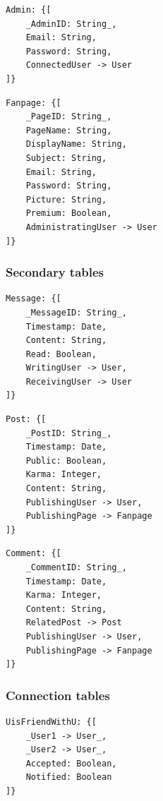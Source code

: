 \documentclass[11pt,a4paper]{report}
\begin{document}
\begin{lstlisting}[frame=single, caption=\emph{Admin}-table, keepspaces=true, breaklines=true]
Admin: {[
    _AdminID: String_, 
    Email: String, 
    Password: String,
    ConnectedUser -> User
]}
\end{lstlisting}

\begin{lstlisting}[frame=single, caption=\emph{Fanpage}-table, keepspaces=true, breaklines=true]
Fanpage: {[
    _PageID: String_, 
    PageName: String,
    DisplayName: String,
    Subject: String,
    Email: String, 
    Password: String,
    Picture: String,
    Premium: Boolean,
    AdministratingUser -> User
]}
\end{lstlisting}

\subsubsection{Secondary tables}
\begin{lstlisting}[frame=single, caption=\emph{Messages}-table, keepspaces=true, breaklines=true]
Message: {[
    _MessageID: String_, 
    Timestamp: Date,
    Content: String,
    Read: Boolean,
    WritingUser -> User,
    ReceivingUser -> User
]}
\end{lstlisting}

\begin{lstlisting}[frame=single, caption=\emph{Post}-table, keepspaces=true, breaklines=true]
Post: {[
    _PostID: String_, 
    Timestamp: Date,
    Public: Boolean,
    Karma: Integer,
    Content: String,
    PublishingUser -> User,
    PublishingPage -> Fanpage
]}
\end{lstlisting}

\begin{lstlisting}[frame=single, caption=\emph{Comments}-table, keepspaces=true, breaklines=true]
Comment: {[
    _CommentID: String_, 
    Timestamp: Date,
    Karma: Integer,
    Content: String,
    RelatedPost -> Post
    PublishingUser -> User,
    PublishingPage -> Fanpage
]}
\end{lstlisting}

\subsubsection{Connection tables}
\begin{lstlisting}[frame=single, caption=\emph{User is friend with user}-table, keepspaces=true, breaklines=true]
UisFriendWithU: {[
    _User1 -> User_, 
    _User2 -> User_,
    Accepted: Boolean,
    Notified: Boolean
]}
\end{lstlisting}
\end{document}

